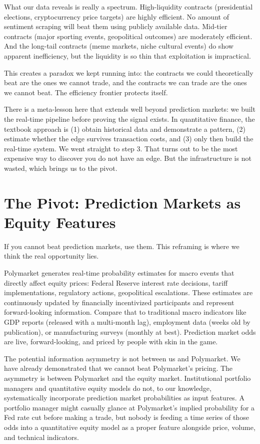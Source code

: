 \documentclass[conference]{IEEEtran}
\begin{document}
What our data reveals is really a spectrum. High-liquidity contracts (presidential elections, cryptocurrency price targets) are highly efficient. No amount of sentiment scraping will beat them using publicly available data. Mid-tier contracts (major sporting events, geopolitical outcomes) are moderately efficient. And the long-tail contracts (meme markets, niche cultural events) do show apparent inefficiency, but the liquidity is so thin that exploitation is impractical.

This creates a paradox we kept running into: the contracts we could theoretically beat are the ones we cannot trade, and the contracts we can trade are the ones we cannot beat. The efficiency frontier protects itself.

There is a meta-lesson here that extends well beyond prediction markets: we built the real-time pipeline before proving the signal exists. In quantitative finance, the textbook approach is (1) obtain historical data and demonstrate a pattern, (2) estimate whether the edge survives transaction costs, and (3) only then build the real-time system. We went straight to step 3. That turns out to be the most expensive way to discover you do not have an edge. But the infrastructure is not wasted, which brings us to the pivot.

\section{The Pivot: Prediction Markets as Equity Features}

If you cannot beat prediction markets, use them. This reframing is where we think the real opportunity lies.

Polymarket generates real-time probability estimates for macro events that directly affect equity prices: Federal Reserve interest rate decisions, tariff implementations, regulatory actions, geopolitical escalations. These estimates are continuously updated by financially incentivized participants and represent forward-looking information. Compare that to traditional macro indicators like GDP reports (released with a multi-month lag), employment data (weeks old by publication), or manufacturing surveys (monthly at best). Prediction market odds are live, forward-looking, and priced by people with skin in the game.

The potential information asymmetry is not between us and Polymarket. We have already demonstrated that we cannot beat Polymarket's pricing. The asymmetry is between Polymarket and the equity market. Institutional portfolio managers and quantitative equity models do not, to our knowledge, systematically incorporate prediction market probabilities as input features. A portfolio manager might casually glance at Polymarket's implied probability for a Fed rate cut before making a trade, but nobody is feeding a time series of those odds into a quantitative equity model as a proper feature alongside price, volume, and technical indicators.
\end{document}
